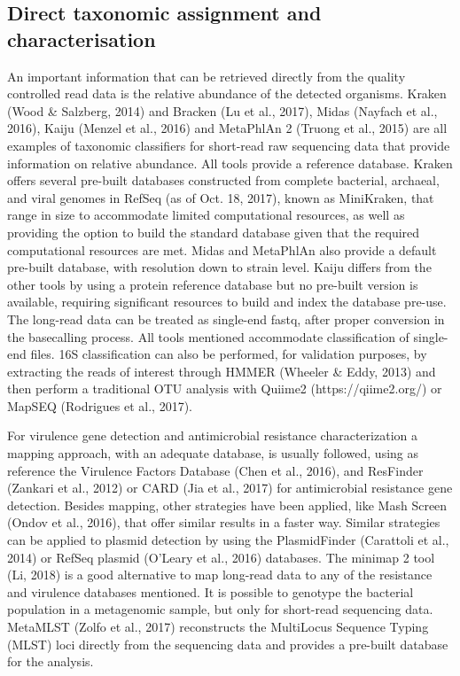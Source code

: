 \subsection{Direct taxonomic assignment and characterisation}

An important information that can be retrieved directly from the quality controlled read data is the relative abundance of the detected organisms. Kraken (Wood & Salzberg, 2014) and Bracken (Lu et al., 2017), Midas (Nayfach et al., 2016), Kaiju (Menzel et al., 2016) and MetaPhlAn 2 (Truong et al., 2015) are all examples of taxonomic classifiers for short-read raw sequencing data that provide information on relative abundance. All tools provide a reference database. Kraken offers several pre-built databases constructed from complete bacterial, archaeal, and viral genomes in RefSeq (as of Oct. 18, 2017), known as MiniKraken, that range in size to accommodate limited computational resources, as well as providing the option to build the standard database given that the required computational resources are met. Midas and MetaPhlAn also provide a default pre-built database, with resolution down to strain level. Kaiju differs from the other tools by using a protein reference database but no pre-built version is available, requiring significant resources to build and index the database pre-use. 
The long-read data can be treated as single-end fastq, after proper conversion in the basecalling process. All tools mentioned accommodate classification of single-end files. 
16S classification can also be performed, for validation purposes, by extracting the reads of interest through HMMER (Wheeler & Eddy, 2013) and then perform a traditional OTU analysis with Quiime2 (https://qiime2.org/) or MapSEQ (Rodrigues et al., 2017).  

For virulence gene detection and antimicrobial resistance characterization a mapping approach, with an adequate database, is usually followed, using as reference the Virulence Factors Database (Chen et al., 2016), and ResFinder (Zankari et al., 2012) or CARD (Jia et al., 2017) for antimicrobial resistance gene detection. Besides mapping, other strategies have been applied, like Mash Screen (Ondov et al., 2016), that offer similar results in a faster way.  Similar strategies can be applied to plasmid detection by using the PlasmidFinder (Carattoli et al., 2014) or RefSeq plasmid (O’Leary et al., 2016) databases. The minimap 2 tool (Li, 2018) is a good alternative to map long-read data to any of the resistance and virulence databases mentioned. 
It is possible to genotype the bacterial population in a metagenomic sample, but only for short-read sequencing data.  MetaMLST (Zolfo et al., 2017) reconstructs the MultiLocus Sequence Typing (MLST) loci directly from the sequencing data and provides a pre-built database for the analysis.

